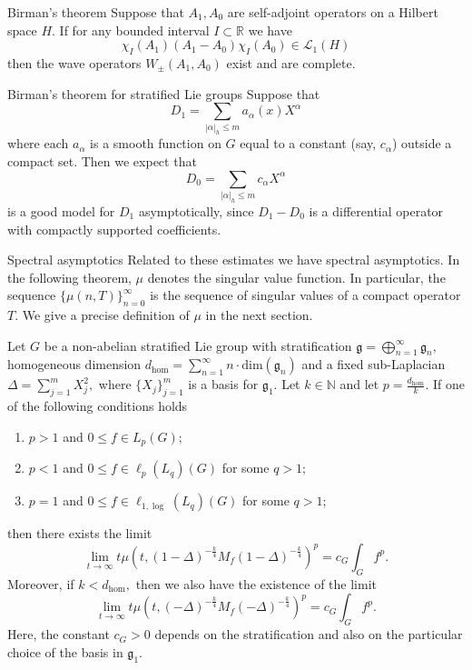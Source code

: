 \documentclass{beamer}
\numberwithin{equation}{section}
\theoremstyle{plain}
\theoremstyle{plain}
\theoremstyle{definition}
\theoremstyle{plain}
\theoremstyle{plain}
\theoremstyle{definition}
\newcommand{\Rl}{\mathbb{R}}
\newcommand{\Lc}{\mathcal{L}}
\newcommand{\gf}{\mathfrak{g}}
\begin{document}
\begin{frame}{Birman's theorem}
  Suppose that $A_1,A_0$ are self-adjoint operators on a Hilbert space $H.$ If for any bounded interval $I\subset \Rl$ we have
  \[
    \chi_I(A_1)(A_1-A_0)\chi_{I}(A_0) \in \Lc_1(H)
  \]
  then the wave operators $W_{\pm}(A_1,A_0)$ exist and are complete.
\end{frame}

\begin{frame}{Birman's theorem for stratified Lie groups}
  Suppose that
  \[
      D_1 = \sum_{|\alpha|_h\leq m} a_{\alpha}(x)X^{\alpha}
  \]
  where each $a_{\alpha}$ is a smooth function on $G$ equal to a constant (say, $c_{\alpha}$) outside a compact set.
  Then we expect that
  \[
      D_0 = \sum_{|\alpha|_h\leq m} c_{\alpha}X^{\alpha}
  \]
  is a good model for $D_1$ asymptotically, since $D_1-D_0$ is a differential operator with compactly supported coefficients.
\end{frame}


\begin{frame}{Spectral asymptotics}
Related to these estimates we have spectral asymptotics. In the following theorem, $\mu$ denotes the singular value function. In particular, the sequence $\{\mu(n,T)\}_{n=0}^\infty$ is the sequence of singular values of a compact operator $T.$ We give a precise definition of $\mu$ in the next section.
\begin{theorem}\label{main_asymptotic_formula}
Let $G$ be a non-abelian stratified Lie group with stratification $\gf = \bigoplus_{n=1}^\infty \gf_n,$ homogeneous dimension $d_{\hom} = \sum_{n=1}^\infty n\cdot \mathrm{dim}(\gf_n)$
and a fixed sub-Laplacian $\Delta = \sum_{j=1}^m X_j^2,$ where $\{X_j\}_{j=1}^m$ is a basis for $\gf_1.$ Let $k\in\mathbb{N}$ and let $p=\frac{d_{\hom}}{k}.$ If one of the following conditions holds
\begin{enumerate}[{\rm (i)}]
\item{} $p>1$ and $0\leq f \in L_p(G);$
\item{} $p<1$ and $0\leq f\in \ell_p(L_q)(G)$ for some $q>1;$
\item{} $p=1$ and $0\leq f\in \ell_{1,\log}(L_q)(G)$ for some $q>1;$
\end{enumerate}
then there exists the limit
$$\lim_{t\to\infty} t\mu(t,(1-\Delta)^{-\frac{k}{4}}M_f(1-\Delta)^{-\frac{k}{4}})^p=c_G\int_G f^p.$$
Moreover, if $k<d_{\hom},$ then we also have the existence of the limit
$$\lim_{t\to\infty} t\mu(t,(-\Delta)^{-\frac{k}{4}}M_f(-\Delta)^{-\frac{k}{4}})^p=c_G\int_G f^p.$$
Here, the constant $c_G>0$ depends on the stratification and also on the particular choice of the basis in $\gf_1.$
\end{theorem}
\end{frame}
\end{document}
